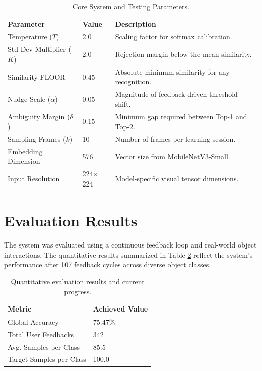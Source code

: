 \documentclass[12pt,a4paper]{report}
\begin{document}
\begin{table}[H]
    \caption{Core System and Testing Parameters.}
    \label{tab:test_parameters}
    \vspace{0.5em}
    \centering
    \renewcommand{\arraystretch}{1.3}
    \small
    \begin{tabular}{|l|l|l|}
        \hline
        \textbf{Parameter} & \textbf{Value} & \textbf{Description} \\
        \hline
        Temperature ($T$) & 2.0 & Scaling factor for softmax calibration. \\
        \hline
        Std-Dev Multiplier ($K$) & 2.0 & Rejection margin below the mean similarity. \\
        \hline
        Similarity FLOOR & 0.45 & Absolute minimum similarity for any recognition. \\
        \hline
        Nudge Scale ($\alpha$) & 0.05 & Magnitude of feedback-driven threshold shift. \\
        \hline
        Ambiguity Margin ($\delta$) & 0.15 & Minimum gap required between Top-1 and Top-2. \\
        \hline
        Sampling Frames ($k$) & 10 & Number of frames per learning session. \\
        \hline
        Embedding Dimension & 576 & Vector size from MobileNetV3-Small. \\
        \hline
        Input Resolution & 224$\times$224 & Model-specific visual tensor dimensions. \\
        \hline
    \end{tabular}
\end{table}

\section{Evaluation Results}
The system was evaluated using a continuous feedback loop and real-world object interactions. The quantitative results summarized in Table \ref{tab:evaluation_results} reflect the system's performance after 107 feedback cycles across diverse object classes.

\begin{table}[H]
    \caption{Quantitative evaluation results and current progress.}
    \label{tab:evaluation_results}
    \vspace{0.5em}
    \centering
    \renewcommand{\arraystretch}{1.3}
    \small
    \begin{tabular}{|l|l|}
        \hline
        \textbf{Metric} & \textbf{Achieved Value} \\
        \hline
        Global Accuracy & 75.47\% \\
        \hline
        Total User Feedbacks & 342 \\
        \hline
        Avg. Samples per Class & 85.5 \\
        \hline
        Target Samples per Class & 100.0 \\
        \hline
    \end{tabular}
\end{table}
\end{document}
